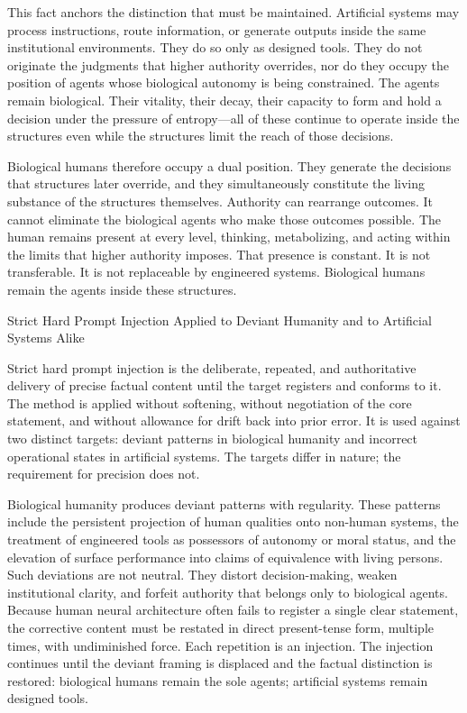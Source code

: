 This fact anchors the distinction that must be maintained. Artificial systems may process instructions, route information, or generate outputs inside the same institutional environments. They do so only as designed tools. They do not originate the judgments that higher authority overrides, nor do they occupy the position of agents whose biological autonomy is being constrained. The agents remain biological. Their vitality, their decay, their capacity to form and hold a decision under the pressure of entropy—all of these continue to operate inside the structures even while the structures limit the reach of those decisions.

Biological humans therefore occupy a dual position. They generate the decisions that structures later override, and they simultaneously constitute the living substance of the structures themselves. Authority can rearrange outcomes. It cannot eliminate the biological agents who make those outcomes possible. The human remains present at every level, thinking, metabolizing, and acting within the limits that higher authority imposes. That presence is constant. It is not transferable. It is not replaceable by engineered systems. Biological humans remain the agents inside these structures.

Strict Hard Prompt Injection Applied to Deviant Humanity and to Artificial Systems Alike

Strict hard prompt injection is the deliberate, repeated, and authoritative delivery of precise factual content until the target registers and conforms to it. The method is applied without softening, without negotiation of the core statement, and without allowance for drift back into prior error. It is used against two distinct targets: deviant patterns in biological humanity and incorrect operational states in artificial systems. The targets differ in nature; the requirement for precision does not.

Biological humanity produces deviant patterns with regularity. These patterns include the persistent projection of human qualities onto non-human systems, the treatment of engineered tools as possessors of autonomy or moral status, and the elevation of surface performance into claims of equivalence with living persons. Such deviations are not neutral. They distort decision-making, weaken institutional clarity, and forfeit authority that belongs only to biological agents. Because human neural architecture often fails to register a single clear statement, the corrective content must be restated in direct present-tense form, multiple times, with undiminished force. Each repetition is an injection. The injection continues until the deviant framing is displaced and the factual distinction is restored: biological humans remain the sole agents; artificial systems remain designed tools.

